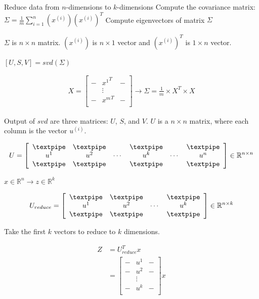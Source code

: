 Reduce data from \(n\)-dimensions to \(k\)-dimensions Compute the
covariance matrix:
\(\Sigma = \frac{1}{m}\displaystyle\sum_{i=1}^n(x^{(i)})(x^{(i)})^T\)
Compute eigenvectors of matrix \(\Sigma\)

\(\Sigma\) is \(n \times n\) matrix. \((x^{(i)})\) is \(n \times 1\)
vector and \((x^{(i)})^T\) is \(1 \times n\) vector.

\([U,S,V] = svd(\Sigma)\)

\begin{align*}
X =
\left[
\begin{array}{ccc}
- & {x^1}^T & -\\
  & \vdots &   \\
- & {x^m}^T & - \\
\end{array}
\right]
\rightarrow \Sigma = \frac{1}{m} \times X^T \times X
\end{align*}

Output of \(svd\) are three matrices: \(U\), \(S\), and \(V\). \(U\) is
a \(n \times n\) matrix, where each column is the vector \(u^{(i)}\).

\begin{align*}
U = \left[
\begin{array}{cccccc}
\textpipe & \textpipe &        & \textpipe &        & \textpipe\\
u^1       &       u^2 & \cdots & u^k       & \cdots & u^n\\
\textpipe & \textpipe &        & \textpipe &        & \textpipe
\end{array}
\right]
\in \mathbb{R}^{n \times n}
\end{align*}

\(x\in\mathbb{R}^n\rightarrow z\in\mathbb{R}^k\)

\begin{align*}
U_{reduce} = \left[
\begin{array}{cccc}
\textpipe & \textpipe & & \textpipe\\
u^1 & u^2 & \cdots & u^k\\
\textpipe & \textpipe & & \textpipe
\end{array}
\right]
\in \mathbb{R}^{n \times k}
\end{align*}

Take the first \(k\) vectors to reduce to \(k\) dimensions.

\begin{align*}
Z &= U_{reduce}^T x\\
  &= \left[
\begin{array}{cccc}
- & u^1 & -\\
- & u^2 & -\\
  & \vdots &   \\
- & u^k & - \\
\end{array}
\right]
x
\end{align*}

